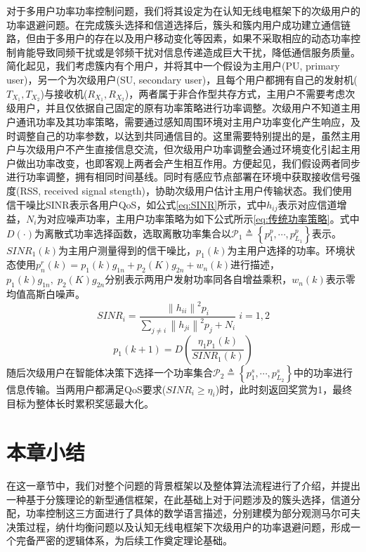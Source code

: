 对于多用户功率功率控制问题，我们将其设定为在认知无线电框架下的次级用户的功率退避问题。在完成簇头选择和信道选择后，簇头和簇内用户成功建立通信链路，但由于多用户的存在以及用户移动变化等因素，如果不采取相应的动态功率控制肯能导致同频干扰或是邻频干扰对信息传递造成巨大干扰，降低通信服务质量。简化起见，我们考虑簇内有个用户，并将其中一个假设为主用户(PU, primary user)，另一个为次级用户(SU, secondary user)，且每个用户都拥有自己的发射机($T_{X_{1}},T_{X_{2}}$)与接收机($R_{X_{1}},R_{X_{2}}$)，两者属于非合作型共存方式，主用户不需要考虑次级用户，并且仅依据自己固定的原有功率策略进行功率调整。次级用户不知道主用户通讯功率及其功率策略，需要通过感知周围环境对主用户功率变化产生响应，及时调整自己的功率参数，以达到共同通信目的。这里需要特别提出的是，虽然主用户与次级用户不产生直接信息交流，但次级用户功率调整会通过环境变化引起主用户做出功率改变，也即客观上两者会产生相互作用。方便起见，我们假设两者同步进行功率调整，拥有相同时间基线。同时有感应节点部署在环境中获取接收信号强度(RSS, received signal stength)，协助次级用户估计主用户传输状态。我们使用信干噪比SINR表示各用户QoS，如公式\ref{eq:SINR}所示，式中$h_{ij}$表示对应信道增益，$N_{i}$为对应噪声功率，主用户功率策略\cite{Grandhi1998Constrained}为如下公式所示\ref{eq:传统功率策略}。式中$D\left ( \cdot  \right )$为离散式功率选择函数，选取离散功率集合以$\mathcal{P}_{1}\triangleq\left \{ p_{1}^{p},\cdots,p_{L_{1}}^{p} \right \}$表示。$SINR_{1}(k)$为主用户测量得到的信干噪比，$p_{1}(k)$为主用户选择的功率。环境状态使用$p_{n}^{r}(k)=p_{1}(k)g_{1n}+p_{2}(K)g_{2n}+w_{n}(k)$进行描述，$p_{1}(k)g_{1n},\;p_{2}(K)g_{2n}$分别表示两用户发射功率同各自增益乘积，$w_{n}(k)$表示零均值高斯白噪声。
\begin{equation}\label{eq:SINR}
SINR_{i}=\frac{\left \| h_{ii} \right \|^{2}p_{i}}{\sum_{j\neq i}\left \| h_{ji} \right \|^2p_{j}+N_{i}}\; i=1,2 
\end{equation}
\begin{equation}\label{eq:传统功率策略}
p_{1}\left ( k+1 \right )=D\left ( \frac{\eta _{1}p_{1}\left ( k \right )}{SINR_{1}\left ( k \right )} \right )
\end{equation}
随后次级用户在智能体决策下选择一个功率集合$\mathcal{P}_{2}\triangleq\left \{ p_{1}^{s},\cdots,p_{L_{2}}^{s} \right \}$中的功率进行信息传输。当两用户都满足QoS要求($SINR_{i}\geqslant\eta_{i}$)时，此时刻返回奖赏为1，最终目标为整体长时累积奖惩最大化。
\section{本章小结}
在这一章节中，我们对整个问题的背景框架以及整体算法流程进行了介绍，并提出一种基于分簇理论的新型通信框架，在此基础上对于问题涉及的簇头选择，信道分配，功率控制这三方面进行了具体的数学语言描述，分别建模为部分观测马尔可夫决策过程，纳什均衡问题以及认知无线电框架下次级用户的功率退避问题，形成一个完备严密的逻辑体系，为后续工作奠定理论基础。



